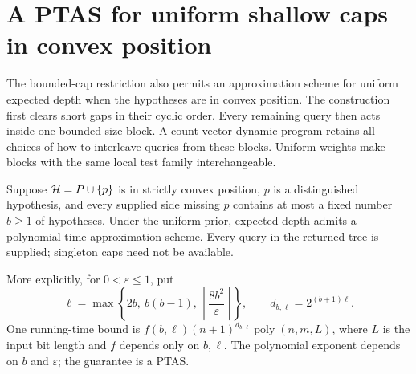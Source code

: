 \section{A PTAS for uniform shallow caps in convex position}
\label{sec:uniform-cap-ptas}

The bounded-cap restriction also permits an approximation scheme for
uniform expected depth when the hypotheses are in convex position.
The construction first clears short gaps in their cyclic order.
Every remaining query then acts inside one bounded-size block.
A count-vector dynamic program retains all choices of how to interleave
queries from these blocks. Uniform weights make blocks with the same
local test family interchangeable.

\begin{theorem}\label{thm:uniform-cap-ptas}
Suppose $\mathcal H=P\cup\{p\}$ is in strictly convex position, $p$ is a
distinguished hypothesis, and every supplied side missing $p$ contains
at most a fixed number $b\ge1$ of hypotheses. Under the uniform prior,
expected depth admits a polynomial-time approximation scheme. Every
query in the returned tree is supplied; singleton caps need not be
available.

More explicitly, for $0<\varepsilon\le1$, put
\[
 \ell=\max\left\{2b,\ b(b-1),\
                 \left\lceil\frac{8b^2}{\varepsilon}\right\rceil\right\},
 \qquad d_{b,\ell}=2^{(b+1)\ell}.
\]
One running-time bound is
$f(b,\ell)(n+1)^{d_{b,\ell}}\operatorname{poly}(n,m,L)$, where
$L$ is the input bit length and $f$ depends only on $b,\ell$.
The polynomial exponent depends on $b$ and $\varepsilon$; the
guarantee is a PTAS.
\end{theorem}

